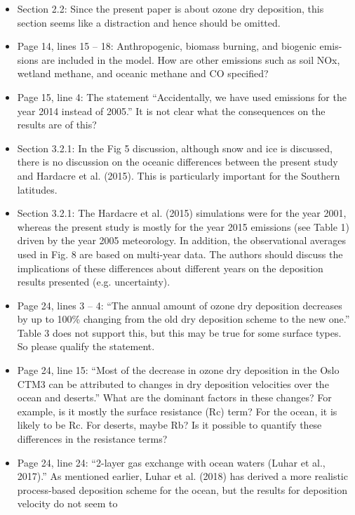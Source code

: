\documentclass{scrartcl}
\begin{document}
\begin{itemize}
\item {\color{blue}  Section 2.2: Since the present paper is about ozone dry deposition, this section
seems like a distraction and hence should be omitted.} \emph{}
\item {\color{blue}  Page 14, lines 15 -- 18: Anthropogenic, biomass burning, and biogenic emis-
sions are included in the model. How are other emissions such as soil NOx, wetland
methane, and oceanic methane and CO specified?} \emph{}
\item {\color{blue}  Page 15, line 4: The statement “Accidentally, we have used emissions for the year
2014 instead of 2005.” It is not clear what the consequences on the results are of this? } \emph{}
\item {\color{blue}  Section 3.2.1: In the Fig 5 discussion, although snow and ice is discussed, there is
no discussion on the oceanic differences between the present study and Hardacre et
al. (2015). This is particularly important for the Southern latitudes.} \emph{}
\item {\color{blue}  Section 3.2.1: The Hardacre et al. (2015) simulations were for the year 2001,
whereas the present study is mostly for the year 2015 emissions (see Table 1) driven
by the year 2005 meteorology. In addition, the observational averages used in Fig. 8
are based on multi-year data. The authors should discuss the implications of these
differences about different years on the deposition results presented (e.g. uncertainty).} \emph{}
\item {\color{blue}  Page 24, lines 3 -- 4: “The annual amount of ozone dry deposition decreases by up
to 100\% changing from the old dry deposition scheme to the new one.” Table 3 does
not support this, but this may be true for some surface types. So please qualify the
statement.} \emph{}
\item {\color{blue}  Page 24, line 15: “Most of the decrease in ozone dry deposition in the Oslo CTM3
can be attributed to changes in dry deposition velocities over the ocean and deserts.”
What are the dominant factors in these changes? For example, is it mostly the surface
resistance (Rc) term? For the ocean, it is likely to be Rc. For deserts, maybe Rb? Is it
possible to quantify these differences in the resistance terms?} \emph{}
\item {\color{blue}  Page 24, line 24: “2-layer gas exchange with ocean waters (Luhar et al., 2017).”
As mentioned earlier, Luhar et al. (2018) has derived a more realistic process-based
deposition scheme for the ocean, but the results for deposition velocity do not seem to
}
\end{itemize}
\end{document}

